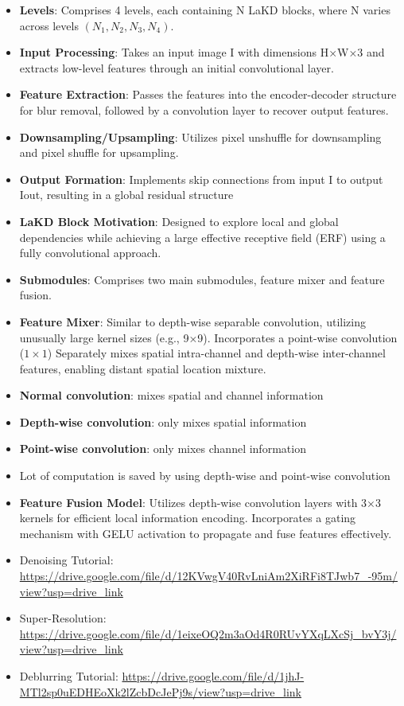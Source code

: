 \documentclass[a4paper]{article}
\begin{document}
\begin{itemize}
    \item \textbf{Levels}: Comprises 4 levels, each containing N LaKD blocks, where N varies across levels $(N_1,N_2,N_3,N_4)$.
    \item \textbf{Input Processing}: Takes an input image I with dimensions H×W×3 and extracts low-level features through an initial convolutional layer.
    \item \textbf{Feature Extraction}: Passes the features into the encoder-decoder structure for blur removal, followed by a convolution layer to recover output features.
    \item \textbf{Downsampling/Upsampling}: Utilizes pixel unshuffle for downsampling and pixel shuffle for upsampling.
    \item \textbf{Output Formation}: Implements skip connections from input I to output Iout, resulting in a global residual structure
    \item \textbf{LaKD Block Motivation}: Designed to explore local and global dependencies while achieving a large effective receptive field (ERF) using a fully convolutional approach.
    \item \textbf{Submodules}: Comprises two main submodules, feature mixer and feature fusion.
    \item \textbf{Feature Mixer}: Similar to depth-wise separable convolution, utilizing unusually large kernel sizes (e.g., 9×9). Incorporates a point-wise convolution ($1\times 1$)  Separately mixes spatial intra-channel and depth-wise inter-channel features, enabling distant spatial location mixture.
    \item \textbf{Normal convolution}: mixes spatial and channel information
    \item \textbf{Depth-wise convolution}: only mixes spatial information
    \item \textbf{Point-wise convolution}: only mixes channel information
    \item Lot of computation is saved by using depth-wise and point-wise convolution
    \item \textbf{Feature Fusion Model}: Utilizes depth-wise convolution layers with 3×3 kernels for efficient local information encoding. Incorporates a gating mechanism with GELU activation to propagate and fuse features effectively.
    \item Denoising Tutorial: \url{https://drive.google.com/file/d/12KVwgV40RvLniAm2XiRFi8TJwb7_-95m/view?usp=drive_link}
    \item Super-Resolution: \url{https://drive.google.com/file/d/1eixeOQ2m3aOd4R0RUvYXqLXcSj_bvY3j/view?usp=drive_link}
    \item Deblurring Tutorial: \url{https://drive.google.com/file/d/1jhJ-MTl2sp0uEDHEoXk2lZcbDcJePj9s/view?usp=drive_link}
\end{itemize}
\end{document}
